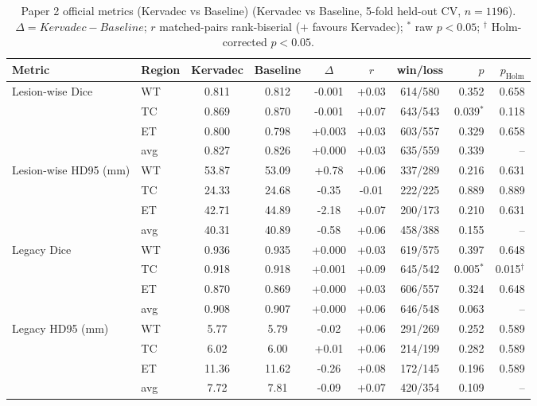 \begin{table}[t]
\centering
\caption{Paper 2 official metrics (Kervadec vs Baseline) (Kervadec vs Baseline, 5-fold held-out CV, $n=1196$). $\Delta=Kervadec-Baseline$; $r$ matched-pairs rank-biserial ($+$ favours Kervadec); $^{*}$ raw $p<0.05$; $^{\dagger}$ Holm-corrected $p<0.05$.}
\label{tab:p2_baseline_main}
\begin{tabular}{llcccccrr}
\toprule
Metric & Region & Kervadec & Baseline & $\Delta$ & $r$ & win/loss & $p$ & $p_{\mathrm{Holm}}$ \\
\midrule
\multirow{4}{*}{Lesion-wise Dice} & WT & 0.811 & 0.812 & -0.001 & +0.03 & 614/580 & 0.352 & 0.658 \\
 & TC & 0.869 & 0.870 & -0.001 & +0.07 & 643/543 & 0.039$^{*}$ & 0.118 \\
 & ET & 0.800 & 0.798 & +0.003 & +0.03 & 603/557 & 0.329 & 0.658 \\
 & avg & 0.827 & 0.826 & +0.000 & +0.03 & 635/559 & 0.339 & -- \\
\midrule
\multirow{4}{*}{Lesion-wise HD95 (mm)} & WT & 53.87 & 53.09 & +0.78 & +0.06 & 337/289 & 0.216 & 0.631 \\
 & TC & 24.33 & 24.68 & -0.35 & -0.01 & 222/225 & 0.889 & 0.889 \\
 & ET & 42.71 & 44.89 & -2.18 & +0.07 & 200/173 & 0.210 & 0.631 \\
 & avg & 40.31 & 40.89 & -0.58 & +0.06 & 458/388 & 0.155 & -- \\
\midrule
\multirow{4}{*}{Legacy Dice} & WT & 0.936 & 0.935 & +0.000 & +0.03 & 619/575 & 0.397 & 0.648 \\
 & TC & 0.918 & 0.918 & +0.001 & +0.09 & 645/542 & 0.005$^{*}$ & 0.015$^{\dagger}$ \\
 & ET & 0.870 & 0.869 & +0.000 & +0.03 & 606/557 & 0.324 & 0.648 \\
 & avg & 0.908 & 0.907 & +0.000 & +0.06 & 646/548 & 0.063 & -- \\
\midrule
\multirow{4}{*}{Legacy HD95 (mm)} & WT & 5.77 & 5.79 & -0.02 & +0.06 & 291/269 & 0.252 & 0.589 \\
 & TC & 6.02 & 6.00 & +0.01 & +0.06 & 214/199 & 0.282 & 0.589 \\
 & ET & 11.36 & 11.62 & -0.26 & +0.08 & 172/145 & 0.196 & 0.589 \\
 & avg & 7.72 & 7.81 & -0.09 & +0.07 & 420/354 & 0.109 & -- \\
\midrule
\bottomrule
\end{tabular}
\end{table}

